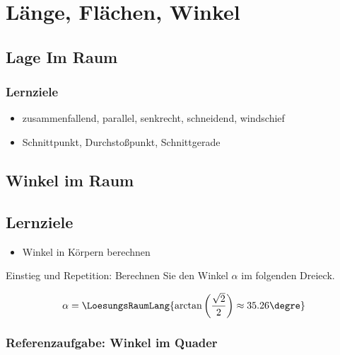 \section{Länge, Flächen, Winkel}



\subsection{Lage Im Raum}

\subsubsection*{Lernziele}
\begin{itemize}
\item zusammenfallend, parallel, senkrecht, schneidend, windschief
\item Schnittpunkt, Durchstoßpunkt, Schnittgerade 
\end{itemize}

\newpage


\subsection{Winkel im Raum}


\subsection*{Lernziele}
\begin{itemize}
\item Winkel in Körpern berechnen
\end{itemize}


Einstieg und Repetition: Berechnen Sie den Winkel $\alpha$ im folgenden Dreieck.


$$\alpha= \LoesungsRaumLang{ \arctan\left(\frac{\sqrt2}2\right) \approx 35.26\degre  }$$

\newpage

\subsubsection{Referenzaufgabe: Winkel im Quader}

